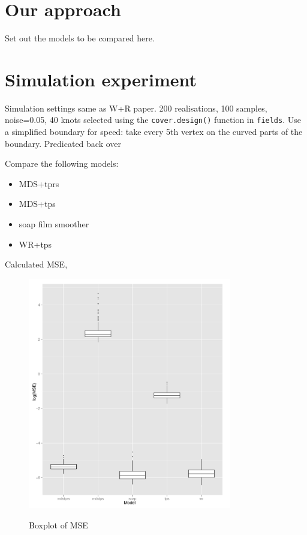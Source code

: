 \documentclass[10pt]{article}
\begin{document}
\section{Our approach}

Set out the models to be compared here.




\section{Simulation experiment}

Simulation settings same as W+R paper. 200 realisations, 100 samples, noise=0.05, 40 knots selected using the \texttt{cover.design()} function in \texttt{fields}. Use a simplified boundary for speed: take every 5th vertex on the curved parts of the boundary. Predicated back over 

Compare the following models:

\begin{itemize}
	\item MDS+tprs
	\item MDS+tps
	\item soap film smoother
	\item WR+tps
\end{itemize}

Calculated MSE, 

\begin{figure}
\centering
\includegraphics[width=3.5in]{figs/ramsim-mse.pdf}\\
\caption{Boxplot of MSE}
\label{ramsim-mse}
\end{figure}
\end{document}
